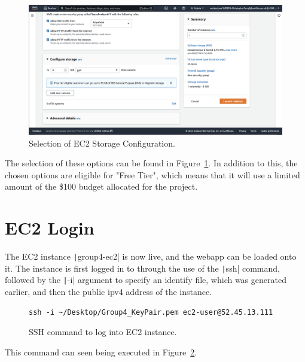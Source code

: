 \begin{figure}[!htbp]
    \centering
    \includegraphics[width=\textwidth]{resources/ec2/create-instance-configure-storage}
    \caption{Selection of EC2 Storage Configuration.}
    \label{fig:ec2-storage}
\end{figure}

The selection of these options can be found in Figure~\ref{fig:ec2-storage}.
In addition to this, the chosen options are eligible for "Free Tier", which means that it will use a limited amount of the
\$100 budget allocated for the project.

\clearpage

\section{EC2 Login}\label{sec:webapp-setup}

The EC2 instance \texttt|group4-ec2| is now live, and the webapp can be loaded onto it.
The instance is first logged in to through the use of the \texttt|ssh| command, followed by the
\texttt|-i| argument to specify an identify file, which was generated earlier, and then the public ipv4 address
of the instance.

\begin{figure}[!htbp]
    \centering
    \begin{verbatim}
ssh -i ~/Desktop/Group4_KeyPair.pem ec2-user@52.45.13.111
    \end{verbatim}
    \caption{SSH command to log into EC2 instance.}\label{fig:ssh-login}
\end{figure}

This command can seen being executed in Figure~\ref{fig:ssh-login}.

